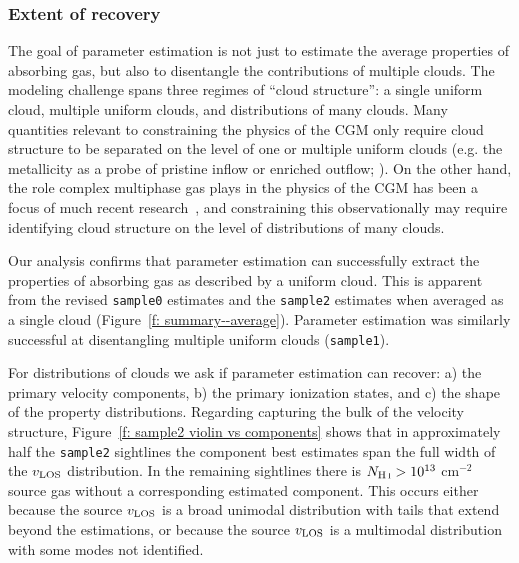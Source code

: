 \documentclass[fleqn,usenatbib]{mnras}
\begin{document}
\subsubsection{Extent of recovery}

The goal of parameter estimation is not just to estimate the average properties of absorbing gas,
but also to disentangle the contributions of multiple clouds.
The modeling challenge spans three regimes of ``cloud structure'':
a single uniform cloud,
multiple uniform clouds,
and distributions of many clouds.
Many quantities relevant to constraining the physics of the CGM only require cloud structure to be separated on the level of one or multiple uniform clouds (e.g. the metallicity as a probe of pristine inflow or enriched outflow; \citealt{hafen2017Lowredshift}).
On the other hand, the role complex multiphase gas plays in the physics of the CGM has been a focus of much recent research~\citep[e.g.][]{voit2015Precipitationregulated, esmerian2021Thermal, smith2023Arkenstone, tan2023Cloudy},
and constraining this observationally may require identifying cloud structure on the level of distributions of many clouds.

Our analysis confirms that parameter estimation can successfully extract the properties of absorbing gas as described by a uniform cloud.
This is apparent from the revised \texttt{sample0} estimates and the \texttt{sample2} estimates when averaged as a single cloud (Figure~\ref{f: summary--average}).
Parameter estimation was similarly successful at disentangling multiple uniform clouds (\texttt{sample1}).

For distributions of clouds we ask if parameter estimation can recover:
a) the primary velocity components,
b) the primary ionization states, and
c) the shape of the property distributions.
Regarding capturing the bulk of the velocity structure, Figure~\ref{f: sample2 violin vs components} shows that in approximately half the \texttt{sample2} sightlines the component best estimates span the full width of the $v_{\rm LOS}$ distribution.
In the remaining sightlines there is $N_{\ion{H}{I}}>10^{13}$ cm$^{-2}$ source gas without a corresponding estimated component.
This occurs either because the source $v_{\rm LOS}$ is a broad unimodal distribution with tails that extend beyond the estimations,
or because the source $v_{\rm LOS}$ is a multimodal distribution with some modes not identified.
\end{document}
